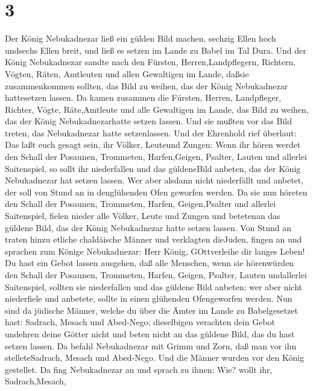 \hypertarget{section-2}{%
\section{3}\label{section-2}}

 Der König Nebukadnezar ließ ein gülden Bild machen, sechzig
Ellen hoch undsechs Ellen breit, und ließ es setzen im Lande zu Babel im
Tal Dura.  Und der König Nebukadnezar sandte nach den
Fürsten, Herren,Landpflegern, Richtern, Vögten, Räten, Amtleuten und
allen Gewaltigen im Lande, daßsie zusammenkommen sollten, das Bild zu
weihen, das der König Nebukadnezar hattesetzen lassen.  Da
kamen zusammen die Fürsten, Herren, Landpfleger, Richter, Vögte,
Räte,Amtleute und alle Gewaltigen im Lande, das Bild zu weihen, das der
König Nebukadnezarhatte setzen lassen. Und sie mußten vor das Bild
treten, das Nebukadnezar hatte setzenlassen.  Und der
Ehrenhold rief überlaut: Das laßt euch gesagt sein, ihr Völker, Leuteund
Zungen:  Wenn ihr hören werdet den Schall der Posaunen,
Trommeten, Harfen,Geigen, Psalter, Lauten und allerlei Saitenspiel, so
sollt ihr niederfallen und das güldeneBild anbeten, das der König
Nebukadnezar hat setzen lassen.  Wer aber alsdann nicht
niederfällt und anbetet, der soll von Stund an in denglühenden Ofen
geworfen werden.  Da sie nun höreten den Schall der
Posaunen, Trommeten, Harfen, Geigen,Psalter und allerlei Saitenspiel,
fielen nieder alle Völker, Leute und Zungen und betetenan das güldene
Bild, das der König Nebukadnezar hatte setzen lassen.  Von
Stund an traten hinzu etliche chaldäische Männer und verklagten
dieJuden,  fingen an und sprachen zum Könige Nebukadnezar:
Herr König, GOttverleihe dir langes Leben!  Du hast ein
Gebot lassen ausgehen, daß alle Menschen, wenn sie hörenwürden den
Schall der Posaunen, Trommeten, Harfen, Geigen, Psalter, Lauten
undallerlei Saitenspiel, sollten sie niederfallen und das güldene Bild
anbeten;  wer aber nicht niederfiele und anbetete, sollte
in einen glühenden Ofengeworfen werden.  Nun sind da
jüdische Männer, welche du über die Ämter im Lande zu Babelgesetzet
hast: Sadrach, Mesach und Abed-Nego; dieselbigen verachten dein Gebot
undehren deine Götter nicht und beten nicht an das güldene Bild, das du
hast setzen lassen.  Da befahl Nebukadnezar mit Grimm und
Zorn, daß man vor ihn stelleteSadrach, Mesach und Abed-Nego. Und die
Männer wurden vor den König gestellet.  Da fing
Nebukadnezar an und sprach zu ihnen: Wie? wollt ihr, Sadrach,Mesach,

